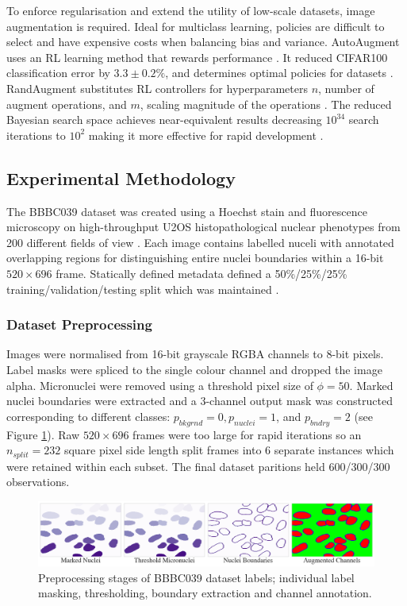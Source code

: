 To enforce regularisation and extend the utility of low-scale datasets, image augmentation is required. Ideal for multiclass learning, policies are difficult to select and have expensive costs when balancing bias and variance. AutoAugment uses an RL learning method that rewards performance \cite{AutoAugment}. It reduced CIFAR100 classification error by $3.3\pm 0.2\%$, and determines optimal policies for datasets \cite{AutoAugment}. RandAugment substitutes RL controllers for hyperparameters $n$, number of augment operations, and $m$, scaling magnitude of the operations \cite{RandAugment}. The reduced Bayesian search space achieves near-equivalent results decreasing $10^{34}$ search iterations to $10^2$ making it more effective for rapid development \cite{RandAugment}.

\subsection{Experimental Methodology}

The BBBC039 dataset was created using a Hoechst stain and fluorescence microscopy on high-throughput U2OS histopathological nuclear phenotypes from 200 different fields of view \cite{BBBC039Dataset}. Each image contains labelled nuceli with annotated overlapping regions for distinguishing entire nuclei boundaries within a 16-bit $520 \times 696$ frame. Statically defined metadata defined a 50\%/25\%/25\% training/validation/testing split which was maintained \cite{BBBC039Dataset}.

\subsubsection{Dataset Preprocessing}

Images were normalised from 16-bit grayscale RGBA channels to 8-bit pixels. Label masks were spliced to the single colour channel and dropped the image alpha. Micronuclei were removed using a threshold pixel size of $\phi = 50$. Marked nuclei boundaries were extracted and a 3-channel output mask was constructed corresponding to different classes: $p_{bkgrnd} = 0, p_{nuclei}=1$, and $p_{bndry} = 2$ (see Figure \ref{fig:example-preprocess-channels}). Raw $520 \times 696$ frames were too large for rapid iterations so an $n_{split} = 232$ square pixel side length split frames into 6 separate instances which were retained within each subset. The final dataset paritions held 600/300/300 observations.

\begin{figure}
    \includegraphics[width=\linewidth]{figures/example_preprocess_channels.png}
    \caption{Preprocessing stages of BBBC039 dataset labels; individual label masking, thresholding, boundary extraction and channel annotation.}
    \label{fig:example-preprocess-channels}
\end{figure}


